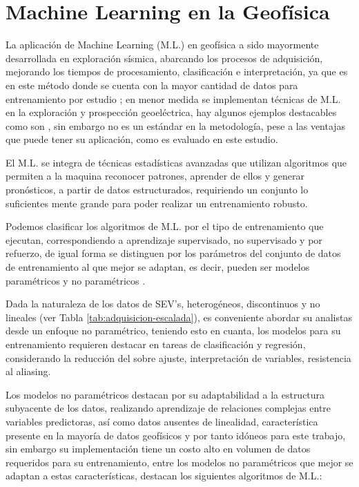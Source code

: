 	\section{Machine Learning en la Geofísica}  
	
	La aplicación de Machine Learning (M.L.) en geofísica a sido mayormente desarrollada en exploración sísmica, abarcando los procesos de adquisición, mejorando los tiempos de procesamiento, clasificación e interpretación, ya que es en este método donde se cuenta con la mayor cantidad de datos para entrenamiento por estudio \citep{wrona2018}; en menor medida se implementan técnicas de M.L. en la exploración y prospección geoeléctrica, hay algunos ejemplos destacables como son \cite{liu2020, el2001, li2024}, sin embargo no es un estándar en la metodología, pese a las ventajas que puede tener su aplicación, como es evaluado en este estudio.
		
	El M.L. se integra de técnicas estadísticas avanzadas que utilizan algoritmos que permiten a la maquina reconocer patrones, aprender de ellos y generar pronósticos, a partir de datos estructurados, requiriendo un conjunto lo suficientes mente grande para poder realizar un entrenamiento robusto.
	
	Podemos clasificar los algoritmos de M.L. por el tipo de entrenamiento que ejecutan, correspondiendo a aprendizaje supervisado, no supervisado y por refuerzo, de igual forma se distinguen por los parámetros del conjunto de datos de entrenamiento al que mejor se adaptan, es decir, pueden ser modelos paramétricos y no paramétricos \citep{li2024}. 
	
	Dada la naturaleza de los datos de SEV's, heterogéneos, discontinuos y no lineales (ver Tabla \ref{tab:adquisicion-escalada}), es conveniente abordar su analistas desde un enfoque no paramétrico, teniendo esto en cuanta, los modelos para su entrenamiento requieren destacar en tareas de clasificación y regresión, considerando la reducción del sobre ajuste, interpretación de variables, resistencia al aliasing.
	
	Los modelos no paramétricos destacan por su adaptabilidad a la estructura subyacente de los datos, realizando aprendizaje de relaciones complejas entre variables predictoras, así como datos ausentes de linealidad, característica presente en la mayoría de datos geofísicos y por tanto idóneos para este trabajo, sin embargo su implementación tiene un costo alto en volumen de datos requeridos para su entrenamiento, entre los modelos no paramétricos que mejor se adaptan a estas características, destacan los siguientes algoritmos de M.L.:
	
